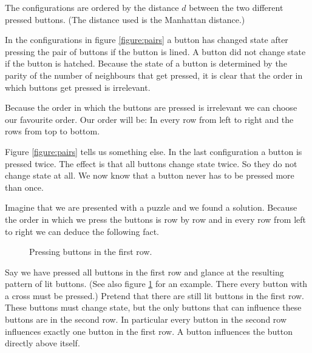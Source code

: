 The configurations are ordered by the distance $d$ between the two different
pressed buttons. (The distance used is the Manhattan distance.)

In the configurations in figure \ref{figure:pairs} a button has changed state
after pressing the pair of buttons if the button is lined. A button did
not change state if the button is hatched. Because the state of a button is
determined by the parity of the number of neighbours that get pressed, it is
clear that the order in which buttons get pressed is irrelevant.

Because the order in which the buttons are pressed is irrelevant we can choose
our favourite order. Our order will be: In every row from left to right and the
rows from top to bottom.

Figure \ref{figure:pairs} tells us something else. In the last configuration a
button is pressed twice. The effect is that all buttons change state twice. So
they do not change state at all. We now know that a button never has to be
pressed more than once.

Imagine that we are presented with a puzzle and we found a solution. Because the
order in which we press the buttons is row by row and in every row from left to
right we can deduce the following fact.
\begin{figure}
	\begin{center}
		\hspace*{\fill}
		\hfill
		\hspace*{\fill}
	\end{center}
	\caption{Pressing buttons in the first row.}\label{figure:chasing}
\end{figure}

Say we have pressed all buttons in the first row and glance at the resulting
pattern of lit buttons. (See also figure \ref{figure:chasing} for an example.
There every button with a cross must be pressed.) Pretend that there are still
lit buttons in the first row. These buttons must change state, but the only
buttons that can influence these buttons are in the second row. In particular
every button in the second row influences exactly one button in the first row. A
button influences the button directly above itself.

